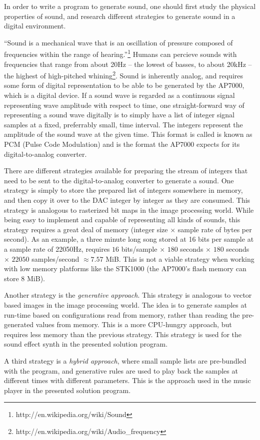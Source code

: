 In order to write a program to generate sound, one should first study the physical properties of sound, and research different strategies to generate sound in a digital environment.

``Sound is a mechanical wave that is an oscillation of pressure composed of frequencies within the range of hearing.''\footnote{http://en.wikipedia.org/wiki/Sound} Humans can percieve sounds with frequencies that range from about 20Hz -- the lowest of basses, to about 20kHz -- the highest of high-pitched whining\footnote{http://en.wikipedia.org/wiki/Audio_frequency}.
Sound is inherently analog, and requires some form of digital representation to be able to be generated by the AP7000, which is a digital device.
If a sound wave is regarded as a continuous signal representing wave amplitude with respect to time, one straight-forward way of representing a sound wave digitally is to simply have a list of integer signal samples at a fixed, preferrably small, time interval.
The integers represent the amplitude of the sound wave at the given time.
This format is called is known as PCM (Pulse Code Modulation) and is the format the AP7000 expects for its digital-to-analog converter.

There are different strategies available for preparing the stream of integers that need to be sent to the digital-to-analog converter to generate a sound.
One strategy is simply to store the prepared list of integers somewhere in memory, and then copy it over to the DAC integer by integer as they are consumed.
This strategy is analogous to rasterized bit maps in the image processing world.
While being easy to implement and capable of representing all kinds of sounds, this strategy requires a great deal of memory (integer size $\times$ sample rate of bytes per second).
As an example, a three minute long song stored at 16 bits per sample at a sample rate of 22050Hz, requires $16$ bits/sample $\times$ $180$ seconds $\times$ $180$ seconds $\times$ $22050$ samples/second $\approx 7.57$ MiB.
This is not a viable strategy when working with low memory platforms like the STK1000 (the AP7000's flash memory can store 8 MiB).

Another strategy is the \emph{generative approach}.
This strategy is analogous to vector based images in the image processing world.
The idea is to generate samples at run-time based on configurations read from memory, rather than reading the pre-generated values from memory.
This is a more CPU-hungry approach, but requires less memory than the previous strategy.
This strategy is used for the sound effect synth in the presented solution program.

A third strategy is a \emph{hybrid approach}, where small sample lists are pre-bundled with the program, and generative rules are used to play back the samples at different times with different parameters.
This is the approach used in the music player in the presented solution program.
